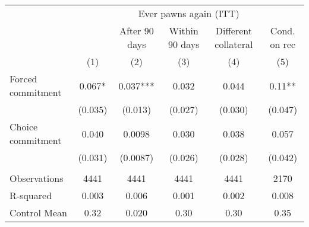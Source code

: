\begin{tabular}{lccccc}
\toprule
      & \multicolumn{5}{c}{Ever pawns again (ITT)} \\
\cmidrule{2-6}      &       & After 90 days & Within 90 days & Different collateral & Cond. on rec \\
\midrule
\midrule
      & (1)   & (2)   & (3)   & (4)   & (5) \\
\midrule
\midrule
Forced commitment & 0.067* & 0.037*** & 0.032 & 0.044 & 0.11** \\
      & (0.035) & (0.013) & (0.027) & (0.030) & (0.047) \\
Choice commitment & 0.040 & 0.0098 & 0.030 & 0.038 & 0.057 \\
      & (0.031) & (0.0087) & (0.026) & (0.028) & (0.042) \\
      &       &       &       &       &  \\
\midrule
Observations & 4441  & 4441  & 4441  & 4441  & 2170 \\
R-squared & 0.003 & 0.006 & 0.001 & 0.002 & 0.008 \\
Control Mean & 0.32  & 0.020 & 0.30  & 0.30  & 0.35 \\
\bottomrule
\bottomrule
\end{tabular}%
